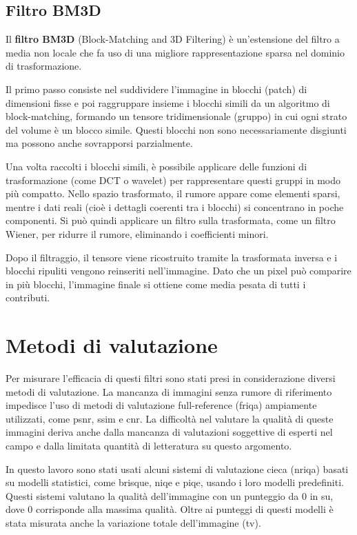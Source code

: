 \documentclass[../main.tex]{subfiles}
\begin{document}
\subsection{Filtro BM3D}

Il \textbf{filtro BM3D} (Block-Matching and 3D Filtering) è un'estensione del filtro a media non locale che fa uso di una migliore rappresentazione sparsa nel dominio di trasformazione.\cite{manjon_2008}

Il primo passo consiste nel suddividere l’immagine in blocchi (patch) di dimensioni fisse e poi raggruppare insieme i blocchi simili da un algoritmo di block-matching, formando un tensore tridimensionale (gruppo) in cui ogni strato del volume è un blocco simile. Questi blocchi non sono necessariamente disgiunti ma possono anche sovrapporsi parzialmente.

Una volta raccolti i blocchi simili, è possibile applicare delle funzioni di trasformazione (come DCT o wavelet) per rappresentare questi gruppi in modo più compatto. Nello spazio trasformato, il rumore appare come elementi sparsi, mentre i dati reali (cioè i dettagli coerenti tra i blocchi) si concentrano in poche componenti. Si può quindi applicare un filtro sulla trasformata, come un filtro Wiener, per ridurre il rumore, eliminando i coefficienti minori.\cite{maggioni_2013}

Dopo il filtraggio, il tensore viene ricostruito tramite la trasformata inversa e i blocchi ripuliti vengono reinseriti nell’immagine. Dato che un pixel può comparire in più blocchi, l’immagine finale si ottiene come media pesata di tutti i contributi.\cite{dabov_2007}

\section{Metodi di valutazione}

Per misurare l'efficacia di questi filtri sono stati presi in considerazione diversi metodi di valutazione. La mancanza di immagini senza rumore di riferimento impedisce l'uso di metodi di valutazione full-reference (\acrshort{friqa}) ampiamente utilizzati, come \acrshort{psnr}\cite{korhonen_2012}, \acrshort{ssim}\cite{wang_2004} e \acrshort{cnr}.\cite{rodriguez_2018} La difficoltà nel valutare la qualità di queste immagini deriva anche dalla mancanza di valutazioni soggettive di esperti nel campo e dalla limitata quantità di letteratura su questo argomento.

In questo lavoro sono stati usati alcuni sistemi di valutazione cieca (\acrshort{nriqa}) basati su modelli statistici, come \acrshort{brisque}\cite{mittal_2011}, \acrshort{niqe}\cite{mittal_2013} e \acrshort{piqe}\cite{venkatanath_2015}, usando i loro modelli predefiniti. Questi sistemi valutano la qualità dell'immagine con un punteggio da 0 in su, dove 0 corrisponde alla massima qualità. Oltre ai punteggi di questi modelli è stata misurata anche la variazione totale dell'immagine (\acrshort{tv}).
\end{document}
